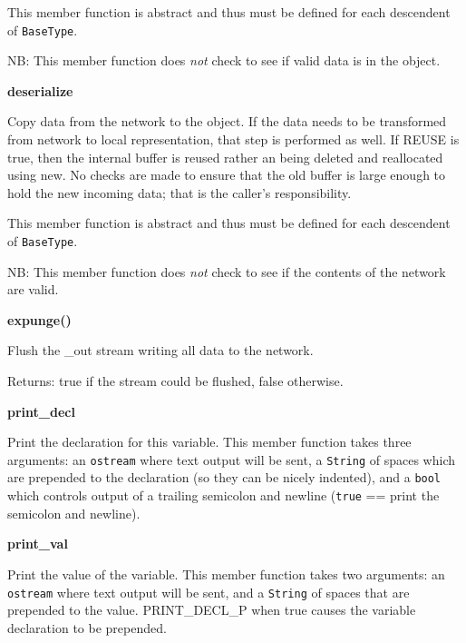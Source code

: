 \begin{description}
This member function is abstract and thus must be defined for each descendent
of {\tt BaseType}.

NB: This member function does {\em not\/} check to see if valid data is in
the object.

\item {\bf deserialize}


Copy data from the network to the object. If the data needs to be transformed
from network to local representation, that step is performed as well. If
REUSE is true, then the internal buffer is reused rather an being deleted and
reallocated using new. No checks are made to ensure that the old buffer is
large enough to hold the new incoming data; that is the caller's
responsibility. 

This member function is abstract and thus must be defined for each descendent
of {\tt BaseType}.

NB: This member function does {\em not\/} check to see if the contents of the
network are valid.

\item {\bf expunge()}


Flush the \_out stream writing all data to the network.

Returns: true if the stream could be flushed, false otherwise.

\item {\bf print\_decl}


Print the declaration for this variable. This member function takes three
arguments: an {\tt ostream} where text output will be sent, a {\tt String} of
spaces which are prepended to the declaration (so they can be nicely
indented), and a {\tt bool} which controls output of a trailing semicolon and
newline ({\tt true} == print the semicolon and newline).

\item {\bf print\_val}


Print the value of the variable. This member function takes two arguments: an
{\tt ostream} where text output will be sent, and a {\tt String} of spaces
that are prepended to the value.  PRINT\_DECL\_P when true causes the
variable declaration to be prepended.


\end{description}
